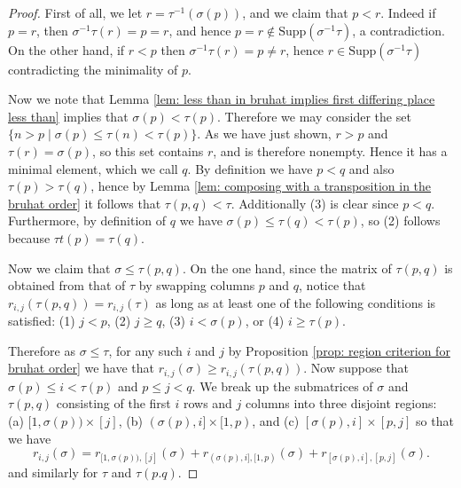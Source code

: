 \documentclass[oneside,11pt]{amsart}
\newcommand{\Supp}{\ensuremath{\text{Supp}}}
\theoremstyle{definition}
\newtheorem{proof techniques}{Proof Techniques}
\begin{document}
\begin{proof}
First of all, we let $r = \tau^{-1}(\sigma(p))$, and we claim that $p < r$. Indeed if $p = r$, then $\sigma^{-1} \tau(r) = p = r$, and hence $p = r \notin \Supp(\sigma^{-1} \tau)$, a contradiction. On the other hand, if $r < p$ then $\sigma^{-1} \tau(r) = p \neq r$, hence $r \in \Supp(\sigma^{-1} \tau)$ contradicting the minimality of $p$. 

Now we note that Lemma \ref{lem: less than in bruhat implies first differing place less than} implies that $\sigma(p) < \tau(p)$. Therefore we may consider the set $\{ n > p \mid \sigma(p) \leq \tau(n) < \tau(p) \}$. As we have just shown, $r > p$ and $\tau(r) = \sigma(p)$, so this set contains $r$, and is therefore nonempty. Hence it has a minimal element, which we call $q$. By definition we have $p < q$ and also $\tau(p) > \tau(q)$, hence by Lemma \ref{lem: composing with a transposition in the bruhat order} it follows that $\tau (p , q) < \tau$. Additionally (3) is clear since $p < q$. Furthermore, by definition of $q$ we have $\sigma(p) \leq \tau(q) <\tau(p)$, so (2) follows because $\tau t(p) = \tau(q)$. 


Now we claim that $\sigma \leq \tau (p , q)$. On the one hand, since the matrix of $\tau (p , q)$ is obtained from that of $\tau$ by swapping columns $p$ and $q$, notice that $r_{i, j}( \tau (p , q) ) = r_{i, j}(\tau)$ as long as at least one of the following conditions is satisfied: (1) $j < p$, (2) $j \geq q$, (3) $i < \sigma(p)$, or (4) $i \geq \tau(p)$.  


Therefore as $\sigma \leq \tau$, for any such $i$ and $j$ by Proposition \ref{prop: region criterion for bruhat order} we have that $r_{i, j}( \sigma ) \geq r_{i, j}( \tau (p , q) )$. Now suppose that $\sigma(p) \leq i < \tau(p)$ and $p \leq j < q$. We break up the submatrices of $\sigma$ and $\tau(p , q)$ consisting of the first $i$ rows and $j$ columns into three disjoint regions: (a) $[1 , \sigma(p) ) \times [j]$, (b) $(\sigma(p) , i] \times [1 , p)$, and (c) $[ \sigma(p) , i] \times [p , j]$ so that we have
\begin{equation*}
r_{i , j}(\sigma) = r_{[1 , \sigma(p) ),  [j]}(\sigma) + r_{ (\sigma(p) , i] , [1 , p)}(\sigma) + r_{[ \sigma(p) , i] , [p , j] }(\sigma).
\end{equation*}
and similarly for $\tau$ and $\tau(p. q)$. 


\end{proof}
\end{document}
